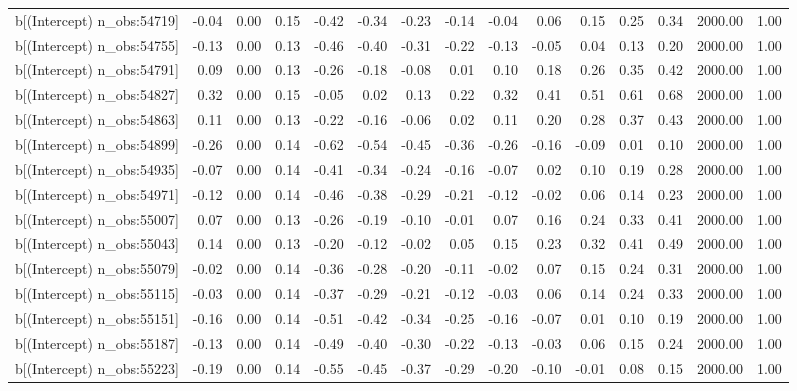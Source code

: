 \begin{table}[ht]
\begin{tabular}{rrrrrrrrrrrrrrr}
  b[(Intercept) n\_obs:54719] & -0.04 & 0.00 & 0.15 & -0.42 & -0.34 & -0.23 & -0.14 & -0.04 & 0.06 & 0.15 & 0.25 & 0.34 & 2000.00 & 1.00 \\ 
  b[(Intercept) n\_obs:54755] & -0.13 & 0.00 & 0.13 & -0.46 & -0.40 & -0.31 & -0.22 & -0.13 & -0.05 & 0.04 & 0.13 & 0.20 & 2000.00 & 1.00 \\ 
  b[(Intercept) n\_obs:54791] & 0.09 & 0.00 & 0.13 & -0.26 & -0.18 & -0.08 & 0.01 & 0.10 & 0.18 & 0.26 & 0.35 & 0.42 & 2000.00 & 1.00 \\ 
  b[(Intercept) n\_obs:54827] & 0.32 & 0.00 & 0.15 & -0.05 & 0.02 & 0.13 & 0.22 & 0.32 & 0.41 & 0.51 & 0.61 & 0.68 & 2000.00 & 1.00 \\ 
  b[(Intercept) n\_obs:54863] & 0.11 & 0.00 & 0.13 & -0.22 & -0.16 & -0.06 & 0.02 & 0.11 & 0.20 & 0.28 & 0.37 & 0.43 & 2000.00 & 1.00 \\ 
  b[(Intercept) n\_obs:54899] & -0.26 & 0.00 & 0.14 & -0.62 & -0.54 & -0.45 & -0.36 & -0.26 & -0.16 & -0.09 & 0.01 & 0.10 & 2000.00 & 1.00 \\ 
  b[(Intercept) n\_obs:54935] & -0.07 & 0.00 & 0.14 & -0.41 & -0.34 & -0.24 & -0.16 & -0.07 & 0.02 & 0.10 & 0.19 & 0.28 & 2000.00 & 1.00 \\ 
  b[(Intercept) n\_obs:54971] & -0.12 & 0.00 & 0.14 & -0.46 & -0.38 & -0.29 & -0.21 & -0.12 & -0.02 & 0.06 & 0.14 & 0.23 & 2000.00 & 1.00 \\ 
  b[(Intercept) n\_obs:55007] & 0.07 & 0.00 & 0.13 & -0.26 & -0.19 & -0.10 & -0.01 & 0.07 & 0.16 & 0.24 & 0.33 & 0.41 & 2000.00 & 1.00 \\ 
  b[(Intercept) n\_obs:55043] & 0.14 & 0.00 & 0.13 & -0.20 & -0.12 & -0.02 & 0.05 & 0.15 & 0.23 & 0.32 & 0.41 & 0.49 & 2000.00 & 1.00 \\ 
  b[(Intercept) n\_obs:55079] & -0.02 & 0.00 & 0.14 & -0.36 & -0.28 & -0.20 & -0.11 & -0.02 & 0.07 & 0.15 & 0.24 & 0.31 & 2000.00 & 1.00 \\ 
  b[(Intercept) n\_obs:55115] & -0.03 & 0.00 & 0.14 & -0.37 & -0.29 & -0.21 & -0.12 & -0.03 & 0.06 & 0.14 & 0.24 & 0.33 & 2000.00 & 1.00 \\ 
  b[(Intercept) n\_obs:55151] & -0.16 & 0.00 & 0.14 & -0.51 & -0.42 & -0.34 & -0.25 & -0.16 & -0.07 & 0.01 & 0.10 & 0.19 & 2000.00 & 1.00 \\ 
  b[(Intercept) n\_obs:55187] & -0.13 & 0.00 & 0.14 & -0.49 & -0.40 & -0.30 & -0.22 & -0.13 & -0.03 & 0.06 & 0.15 & 0.24 & 2000.00 & 1.00 \\ 
  b[(Intercept) n\_obs:55223] & -0.19 & 0.00 & 0.14 & -0.55 & -0.45 & -0.37 & -0.29 & -0.20 & -0.10 & -0.01 & 0.08 & 0.15 & 2000.00 & 1.00 \\ 

\end{tabular}
\end{table}
